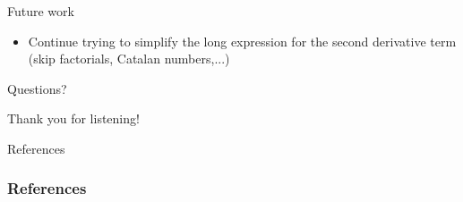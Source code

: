 \documentclass[12pt]{beamer}
\begin{document}
\begin{frame}{Future work}
\begin{itemize}
\item Continue trying to simplify the long expression for the second derivative term (skip factorials, Catalan numbers,...)
\end{itemize}
\end{frame}

\begin{frame}[plain]
\centerline{Questions?}
\end{frame}

\begin{frame}[plain]
\centerline{Thank you for listening!}
\end{frame}

\begin{frame}[allowframebreaks]{References}
\frametitle{References}
\nocite{*}


\end{frame}
\end{document}
